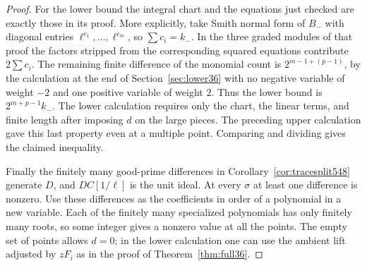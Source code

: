 \documentclass[a4paper,11pt]{article}
\theoremstyle{definition}
\theoremstyle{remark}
\numberwithin{equation}{section}
\begin{document}
\begin{proof}
For the lower bound the integral chart and the equations just
checked are exactly those in its proof. More explicitly, take
Smith normal form of \(B_-\) with diagonal entries
\(\ell^{c_1},\ldots,\ell^{c_m}\), so \(\sum c_i=k_-\).
In the three graded modules of that proof the factors stripped
from the corresponding squared equations contribute \(2\sum c_i\).
The remaining finite difference of the monomial count is
\(2^{m-1+(p-1)}\), by the calculation at the end of
Section~\ref{sec:lower36} with no negative variable of weight
\(-2\) and one positive variable of weight \(2\). Thus the
lower bound is \(2^{m+p-1}k_-\). The lower calculation requires
only the chart, the linear terms, and finite length after
imposing \(d\) on the large pieces. The preceding upper calculation
gave this last property even at a multiple point. Comparing and
dividing gives the claimed inequality.

Finally the finitely many good-prime differences in
Corollary~\ref{cor:tracesplit548} generate \(D\), and \(DC[1/\ell]\)
is the unit ideal. At every \(\sigma\) at least one difference
is nonzero. Use these differences as the coefficients in order
of a polynomial in a new variable. Each of the finitely many
specialized polynomials has only finitely many roots, so some
integer gives a nonzero value at all the points. The empty set
of points allows \(d=0\); in the lower calculation one can use
the ambient lift adjusted by \(zF_i\) as in the proof of
Theorem~\ref{thm:full36}.
\end{proof}
\end{document}
